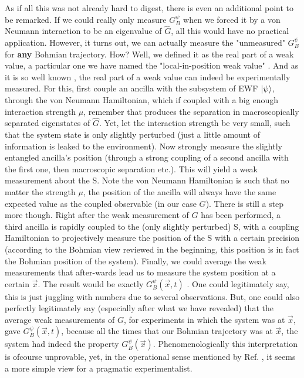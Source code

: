 \documentclass[11pt, a4paper]{article} %
\begin{document}
As if all this was not already hard to digest, there is even an additional point to be remarked. If we could really only measure $G_B^\psi$ when we forced it by a von Neumann interaction to be an eigenvalue of $\hat{G}$, all this would have no practical application. However, it turns out, we can actually measure the "unmeasured" $G_B^\psi$ for {\bf any} Bohmian trajectory. How? Well, we defined it as the real part of a weak value, a particular one we have named the "local-in-position weak value" \cite{DevInPosition1, DevInPosition2}. And as it is so well known \cite{Weak}, the real part of a weak value can indeed be experimentally measured. For this, first couple an ancilla with the subsystem of EWF $\ket{\psi}$, through the von Neumann Hamiltonian, which if coupled with a big enough interaction strength $\mu$, remember that produces the separation in macroscopically separated eigenstates of $\hat{G}$. Yet, let the interaction strength be very small, such that the system state is only slightly perturbed (just a little amount of information is leaked to the environment). Now strongly measure the slightly entangled ancilla's position (through a strong coupling of a second ancilla with the first one, then macroscopic separation etc.). This will yield a weak measurement about the S. Note the von Neumann Hamiltonian is such that no matter the strength $\mu$, the position of the ancilla will always have the same expected value as the coupled observable (in our case $G$). There is still a step more though. Right after the weak measurement of $G$ has been performed, a third ancilla is rapidly coupled to the (only slightly perturbed) S, with a coupling Hamiltonian to projectively measure the position of the S with a certain precision (according to the Bohmian view reviewed in the beginning, this position is in fact the Bohmian position of the system). Finally, we could average the weak measurements that after-wards lead us to measure the system position  at a certain $\vec{x}$. The result would be exactly $G^\psi_B(\vec{x},t)$ \cite{Weak, DevInPosition1}. One could legitimately say, this is just juggling with numbers due to several observations. But, one could also perfectly legitimately say (especially after what we have revealed) that the average weak measurements of $G$, for experiments in which the system was at $\vec{x}$, gave $G^\psi_B(\vec{x},t)$, because all the times that our Bohmian trajectory was at $\vec{x}$, the system had indeed the property $G^\psi_B(\vec{x})$. Phenomenologically this interpretation is ofcourse unprovable, yet, in the operational sense mentioned by Ref. \cite{WisemanVel}, it seems a more simple view for a pragmatic experimentalist.
\end{document}
